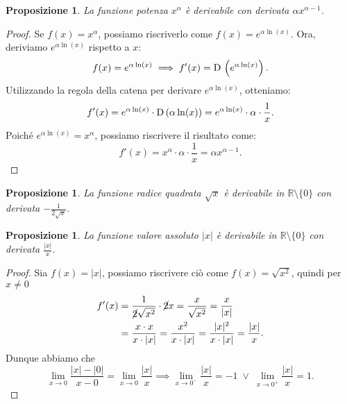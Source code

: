 \documentclass{article}
\theoremstyle{plain}
\newtheorem{prop}[thm]{Proposizione}
\theoremstyle{definition}
\theoremstyle{remark}
\begin{document}
\vspace{10pt}

\begin{bxthm}
\begin{prop}
    La funzione potenza $x^\alpha$ è derivabile con derivata $\alpha x^{\alpha-1}$.
\end{prop}
\end{bxthm}
\begin{proof}
    Se $f(x)=x^\alpha$, possiamo riscriverlo come $f(x)=e^{\alpha \ln(x)}$. 
    Ora, deriviamo $e^{\alpha \ln(x)}$ rispetto a $x$:
    \[
    f(x) = e^{\alpha \ln(x)} \implies f'(x) = \textup{D}\, \left( e^{\alpha \ln(x)} \right).
    \]
    Utilizzando la regola della catena per derivare $e^{\alpha \ln(x)}$, otteniamo:
    \[
    f'(x) = e^{\alpha \ln(x)} \cdot \textup{D}\, (\alpha \ln(x)) = e^{\alpha \ln(x)} \cdot \alpha \cdot \frac{1}{x}.
    \]
    Poiché $e^{\alpha \ln(x)} = x^\alpha$, possiamo riscrivere il risultato come:
    \[
    f'(x) = x^\alpha \cdot \alpha \cdot \frac{1}{x} = \alpha x^{\alpha-1}.
    \]
\end{proof}

\vspace{10pt}

\begin{bxthm}
\begin{prop}
    La funzione radice quadrata $\sqrt{x}$ è derivabile in $\mathbb{R}\setminus\{0\}$ con derivata $-\frac{1}{2\sqrt{x}}$.
\end{prop}
\end{bxthm}

\vspace{10pt}

\begin{bxthm}
\begin{prop}
    La funzione valore assoluto $|x|$ è derivabile in $\mathbb{R}\setminus\{0\}$ con derivata $\frac{|x|}{x}$.
\end{prop}
\end{bxthm}
\begin{proof}
    Sia $f(x)=|x|$, possiamo riscrivere ciò come $f(x)=\sqrt{x^2}$, quindi per $x\neq0$
    \begin{align*}
        f'(x)&=\dfrac{1}{\cancel{2}\sqrt{x^2}}\cdot \cancel{2}x=\dfrac{x}{\sqrt{x^2}}=\dfrac{x}{|x|}\\
        &=\dfrac{x\cdot x}{x\cdot |x|}=\dfrac{x^2}{x\cdot|x|}=\dfrac{|x|^2}{x\cdot |x|}=\dfrac{|x|}{x}.
    \end{align*}
    Dunque abbiamo che
    \[\lim_{x\to0}\dfrac{|x|-|0|}{x-0} = \lim_{x\to0}\dfrac{|x|}{x}\implies\lim_{x\to0^-}\dfrac{|x|}{x} = -1\;\lor\;\lim_{x\to0^+}\dfrac{|x|}{x}=1.\]
\end{proof}
\end{document}
